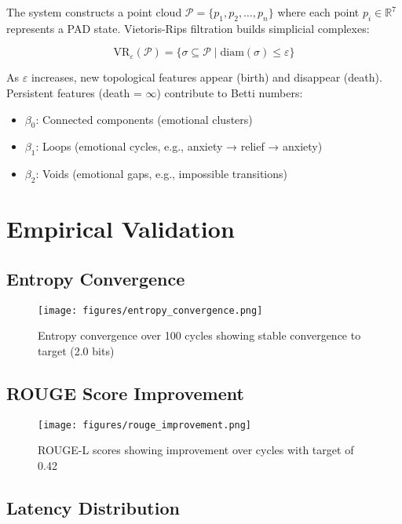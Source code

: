 \documentclass[11pt,a4paper]{article}
\begin{document}
The system constructs a point cloud $\mathcal{P} = \{p_1, p_2, \ldots, p_n\}$ where each point $p_i \in \mathbb{R}^7$ represents a PAD state. Vietoris-Rips filtration builds simplicial complexes:

\begin{equation}
\text{VR}_\varepsilon(\mathcal{P}) = \{\sigma \subseteq \mathcal{P} \mid \text{diam}(\sigma) \leq \varepsilon\}
\end{equation}

As $\varepsilon$ increases, new topological features appear (birth) and disappear (death). Persistent features (death = $\infty$) contribute to Betti numbers:
\begin{itemize}
    \item $\beta_0$: Connected components (emotional clusters)
    \item $\beta_1$: Loops (emotional cycles, e.g., anxiety → relief → anxiety)
    \item $\beta_2$: Voids (emotional gaps, e.g., impossible transitions)
\end{itemize}

\section{Empirical Validation}

\subsection{Entropy Convergence}

\begin{figure}[H]
\centering
\texttt{[image: figures/entropy\_convergence.png]}
\caption{Entropy convergence over 100 cycles showing stable convergence to target (2.0 bits)}
\label{fig:entropy}
\end{figure}

\subsection{ROUGE Score Improvement}

\begin{figure}[H]
\centering
\texttt{[image: figures/rouge\_improvement.png]}
\caption{ROUGE-L scores showing improvement over cycles with target of 0.42}
\label{fig:rouge}
\end{figure}

\subsection{Latency Distribution}
\end{document}
